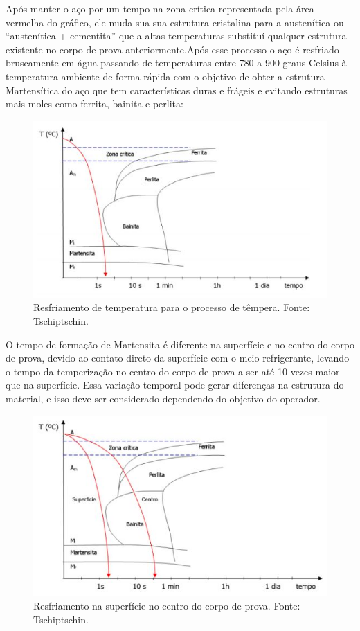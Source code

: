 Após manter o aço por um tempo  na zona crítica representada pela área vermelha do gráfico, ele muda sua sua estrutura cristalina para a austenítica ou “austenítica + cementita” que a altas temperaturas substituí qualquer estrutura existente no corpo de prova anteriormente.Após esse processo o aço é resfriado bruscamente em água passando de temperaturas entre 780 a 900 graus Celsius à temperatura ambiente de forma rápida com o objetivo de obter a estrutura Martensítica do aço que tem características duras e frágeis e evitando estruturas mais moles como ferrita, bainita e perlita:
\begin{figure}[!h]
	\centering
	\label{resfriamento1}
	\includegraphics[keepaspectratio=true,scale=0.8]{figuras/resfriamento1.JPG}
	\caption{Resfriamento de temperatura para o processo de têmpera. Fonte: Tschiptschin.}
\end{figure}

O tempo de formação de Martensita é diferente na superfície e no centro do corpo de prova, devido ao contato direto da superfície com o meio refrigerante, levando o tempo da temperização no centro do corpo de prova a ser até 10 vezes maior que na superfície. Essa variação temporal pode gerar diferenças na estrutura do material, e isso deve ser considerado dependendo do objetivo do operador.

\begin{figure}[!h]
	\centering
	\label{resfriamento2}
	\includegraphics[keepaspectratio=true,scale=0.8]{figuras/resfriamento2.JPG}
	\caption{Resfriamento na superfície no centro do corpo de prova. Fonte: Tschiptschin.}
\end{figure}

